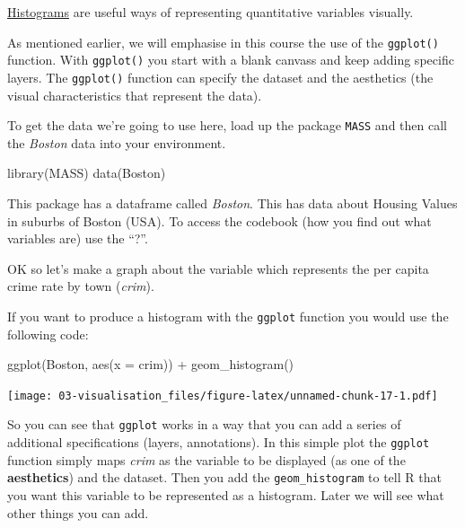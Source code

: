 \documentclass[
]{book}
\newenvironment{Shaded}{\begin{snugshade}}{\end{snugshade}}
\newcommand{\AttributeTok}[1]{\textcolor[rgb]{0.77,0.63,0.00}{#1}}
\newcommand{\FunctionTok}[1]{\textcolor[rgb]{0.00,0.00,0.00}{#1}}
\newcommand{\NormalTok}[1]{#1}
\newcommand{\SpecialCharTok}[1]{\textcolor[rgb]{0.00,0.00,0.00}{#1}}
\begin{document}
\href{http://www.learner.org/courses/againstallodds/unitpages/unit03.html}{Histograms} are useful ways of representing quantitative variables visually.

As mentioned earlier, we will emphasise in this course the use of the \texttt{ggplot()} function. With \texttt{ggplot()} you start with a blank canvass and keep adding specific layers. The \texttt{ggplot()} function can specify the dataset and the aesthetics (the visual characteristics that represent the data).

To get the data we're going to use here, load up the package \texttt{MASS} and then call the \emph{Boston} data into your environment.

\begin{Shaded}
\begin{Highlighting}[]
\FunctionTok{library}\NormalTok{(MASS)}
\FunctionTok{data}\NormalTok{(Boston)}
\end{Highlighting}
\end{Shaded}

This package has a dataframe called \emph{Boston}. This has data about Housing Values in suburbs of Boston (USA). To access the codebook (how you find out what variables are) use the ``?''.

OK so let's make a graph about the variable which represents the per capita crime rate by town (\emph{crim}).

If you want to produce a histogram with the \texttt{ggplot} function you would use the following code:

\begin{Shaded}
\begin{Highlighting}[]
\FunctionTok{ggplot}\NormalTok{(Boston, }\FunctionTok{aes}\NormalTok{(}\AttributeTok{x =}\NormalTok{ crim)) }\SpecialCharTok{+} 
  \FunctionTok{geom\_histogram}\NormalTok{()}
\end{Highlighting}
\end{Shaded}

\texttt{[image: 03-visualisation\_files/figure-latex/unnamed-chunk-17-1.pdf]}

So you can see that \texttt{ggplot} works in a way that you can add a series of additional specifications (layers, annotations). In this simple plot the \texttt{ggplot} function simply maps \emph{crim} as the variable to be displayed (as one of the \textbf{aesthetics}) and the dataset. Then you add the \texttt{geom\_histogram} to tell R that you want this variable to be represented as a histogram. Later we will see what other things you can add.
\end{document}

